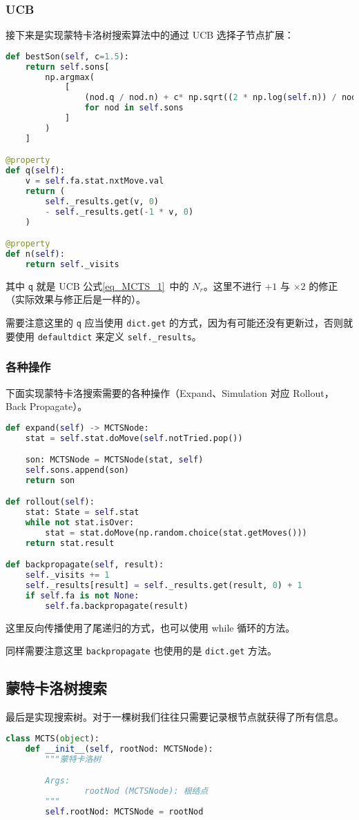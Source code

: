 \subsubsection{UCB}
接下来是实现蒙特卡洛树搜索算法中的通过 UCB 选择子节点扩展：
\begin{lstlisting}[language=python]
def bestSon(self, c=1.5):
    return self.sons[
        np.argmax(
            [
                (nod.q / nod.n) + c* np.sqrt((2 * np.log(self.n)) / nod.n)
                for nod in self.sons
            ]
        )
    ]

@property
def q(self):
    v = self.fa.stat.nxtMove.val
    return (
        self._results.get(v, 0)
        - self._results.get(-1 * v, 0)
    )

@property
def n(self):
    return self._visits
\end{lstlisting}
其中 \verb`q` 就是 UCB 公式\autoref{eq_MCTS_1}~中的 $N_r$。这里不进行 $+1$ 与 $\times 2$ 的修正（实际效果与修正后是一样的）。

需要注意这里的 \verb`q` 应当使用 \verb`dict.get` 的方式，因为有可能还没有更新过，否则就要使用 \verb`defaultdict` 来定义 \verb`self._results`。

\subsubsection{各种操作}
下面实现蒙特卡洛搜索需要的各种操作（Expand、Simulation 对应 Rollout，Back Propagate）。

\begin{lstlisting}[language=python]
def expand(self) -> MCTSNode:
    stat = self.stat.doMove(self.notTried.pop())

    son: MCTSNode = MCTSNode(stat, self)
    self.sons.append(son)
    return son

def rollout(self):
    stat: State = self.stat
    while not stat.isOver:
        stat = stat.doMove(np.random.choice(stat.getMoves()))
    return stat.result

def backpropagate(self, result):
    self._visits += 1
    self._results[result] = self._results.get(result, 0) + 1
    if self.fa is not None:
        self.fa.backpropagate(result)
\end{lstlisting}
这里反向传播使用了尾递归的方式，也可以使用 while 循环的方法。

同样需要注意这里 \verb`backpropagate` 也使用的是 \verb`dict.get` 方法。

\subsection{蒙特卡洛树搜索}
最后是实现搜索树。对于一棵树我们往往只需要记录根节点就获得了所有信息。
\begin{lstlisting}[language=python]
class MCTS(object):
    def __init__(self, rootNod: MCTSNode):
        """蒙特卡洛树

        Args:
                rootNod (MCTSNode): 根结点
        """
        self.rootNod: MCTSNode = rootNod
\end{lstlisting}

